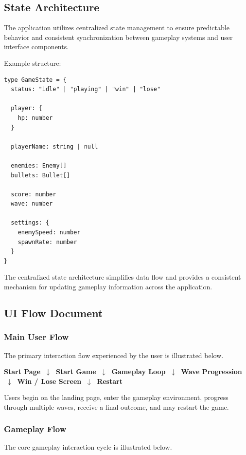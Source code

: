 \documentclass[11pt,a4paper]{article}
\begin{document}
\subsection{State Architecture}

The application utilizes centralized state management to ensure predictable
behavior and consistent synchronization between gameplay systems and user
interface components.

Example structure:

\begin{lstlisting}[style=tslisting]
type GameState = {
  status: "idle" | "playing" | "win" | "lose"

  player: {
    hp: number
  }

  playerName: string | null

  enemies: Enemy[]
  bullets: Bullet[]

  score: number
  wave: number

  settings: {
    enemySpeed: number
    spawnRate: number
  }
}
\end{lstlisting}

The centralized state architecture simplifies data flow and provides a
consistent mechanism for updating gameplay information across the application.

\subsection{UI Flow Document}

\subsubsection{Main User Flow}
The primary interaction flow experienced by the user is illustrated below.

\begin{center}
\textbf{Start Page} $\;\downarrow\;$
\textbf{Start Game} $\;\downarrow\;$
\textbf{Gameplay Loop} $\;\downarrow\;$
\textbf{Wave Progression} $\;\downarrow\;$
\textbf{Win / Lose Screen} $\;\downarrow\;$
\textbf{Restart}
\end{center}

Users begin on the landing page, enter the gameplay environment, progress
through multiple waves, receive a final outcome, and may restart the game.

\subsubsection{Gameplay Flow}
The core gameplay interaction cycle is illustrated below.
\end{document}
